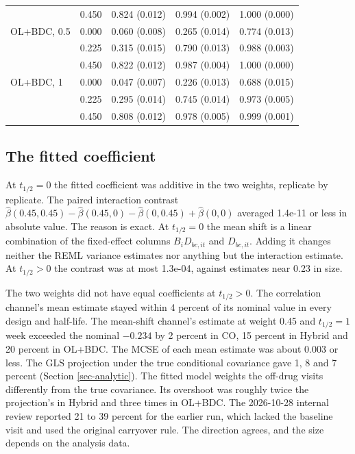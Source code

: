 \documentclass[
  11pt,
]{article}
\begin{document}
\begin{table}[H]
\begin{tabular}{llrrr}
 & 0.450 & 0.824 (0.012) & 0.994 (0.002) & 1.000 (0.000) \\
\addlinespace
OL+BDC, 0.5 & 0.000 & 0.060 (0.008) & 0.265 (0.014) & 0.774 (0.013) \\
 & 0.225 & 0.315 (0.015) & 0.790 (0.013) & 0.988 (0.003) \\
 & 0.450 & 0.822 (0.012) & 0.987 (0.004) & 1.000 (0.000) \\
\addlinespace
OL+BDC, 1 & 0.000 & 0.047 (0.007) & 0.226 (0.013) & 0.688 (0.015) \\
 & 0.225 & 0.295 (0.014) & 0.745 (0.014) & 0.973 (0.005) \\
 & 0.450 & 0.808 (0.012) & 0.978 (0.005) & 0.999 (0.001) \\
\bottomrule
\end{tabular}
\end{table}

\subsection{The fitted coefficient}\label{sec-est}

At \(t_{1/2} = 0\) the fitted coefficient was additive in the two
weights, replicate by replicate. The paired interaction contrast
\(\hat\beta(0.45, 0.45) - \hat\beta(0.45, 0) - \hat\beta(0, 0.45) +
\hat\beta(0, 0)\) averaged
1.4e-11
or less in absolute value. The reason is exact. At \(t_{1/2} = 0\) the
mean shift is a linear combination of the fixed-effect columns
\(B_i D_{bc,it}\) and \(D_{bc,it}\). Adding it changes neither the REML
variance estimates nor anything but the interaction estimate. At
\(t_{1/2} > 0\) the contrast was at most
1.3e-04, against
estimates near 0.23 in size.

The two weights did not have equal coefficients at \(t_{1/2} > 0\). The
correlation channel's mean estimate stayed within
4 percent of its nominal value in every design and
half-life. The
mean-shift channel's estimate at weight 0.45 and \(t_{1/2} = 1\) week
exceeded the nominal \(-0.234\) by
2 percent in CO,
15 percent in Hybrid and
20 percent in OL+BDC. The MCSE of each mean
estimate was about 0.003 or less.
The GLS projection under the true conditional covariance gave
1,
8 and
7 percent (Section
\ref{sec-analytic}). The fitted model weights the off-drug visits
differently from the true covariance. Its overshoot was roughly twice
the projection's in Hybrid and three times in OL+BDC. The 2026-10-28
internal review reported 21 to 39 percent for the earlier run, which
lacked the baseline visit and used the original carryover rule. The
direction agrees, and the size depends on the analysis data.
\end{document}
